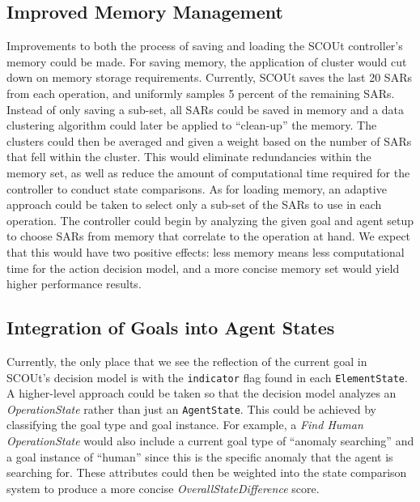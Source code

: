 \subsection{Improved Memory Management}
Improvements to both the process of saving and loading the SCOUt controller's memory could be made.
For saving memory, the application of cluster would cut down on memory storage requirements.
Currently, SCOUt saves the last 20 SARs from each operation, and uniformly samples 5 percent of the remaining SARs.
Instead of only saving a sub-set, all SARs could be saved in memory and a data clustering algorithm could later be applied to ``clean-up'' the memory.
The clusters could then be averaged and given a weight based on the number of SARs that fell within the cluster.
This would eliminate redundancies within the memory set, as well as reduce the amount of computational time required for the controller to conduct state comparisons.
As for loading memory, an adaptive approach could be taken to select only a sub-set of the SARs to use in each operation.
The controller could begin by analyzing the given goal and agent setup to choose SARs from memory that correlate to the operation at hand.
We expect that this would have two positive effects: less memory means less computational time for the action decision model, and a more concise memory set would yield higher performance results.

\subsection{Integration of Goals into Agent States}
Currently, the only place that we see the reflection of the current goal in SCOUt's decision model is with the \texttt{indicator} flag found in each \texttt{ElementState}.
A higher-level approach could be taken so that the decision model analyzes an \textit{OperationState} rather than just an \texttt{AgentState}.
This could be achieved by classifying the goal type and goal instance.
For example, a \textit{Find Human} \textit{OperationState} would also include a current goal type of ``anomaly searching'' and a goal instance of ``human'' since this is the specific anomaly that the agent is searching for.
These attributes could then be weighted into the state comparison system to produce a more concise \textit{OverallStateDifference} score.
